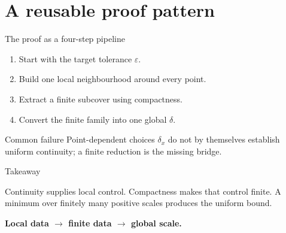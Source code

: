 \documentclass[11pt,aspectratio=169]{beamer}
\begin{document}
\section{A reusable proof pattern}
\SynapticSectionFrame

\begin{frame}{The proof as a four-step pipeline}
  \begin{enumerate}
    \item Start with the target tolerance $\varepsilon$.
    \item Build one local neighbourhood around every point.
    \item Extract a finite subcover using compactness.
    \item Convert the finite family into one global $\delta$.
  \end{enumerate}

  \begin{alertblock}{Common failure}
    Point-dependent choices $\delta_x$ do not by themselves establish uniform
    continuity; a finite reduction is the missing bridge.
  \end{alertblock}
\end{frame}

\begin{frame}{Takeaway}
  \begin{synlecturesummary}
    Continuity supplies local control. Compactness makes that control finite.
    A minimum over finitely many positive scales produces the uniform bound.
  \end{synlecturesummary}

  \vfill
  {\Large\bfseries\color{syn-primary}
    Local data $\longrightarrow$ finite data $\longrightarrow$ global scale.}
\end{frame}
\end{document}
